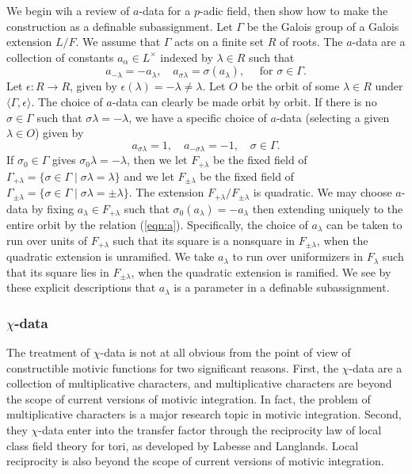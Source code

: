 We begin wih a review of $a$-data for a $p$-adic field, then show how to make the construction as a definable subassignment.
Let $\Gamma$ be the Galois group of a Galois extension $L/F$.  We assume that $\Gamma$ acts on a finite set $R$ of roots.
The $a$-data are a collection of constants $a_\alpha\in L^\times$ indexed by $\lambda\in R$ such that
\begin{equation}\label{eqn:a}
a_{-\lambda} = -a_\lambda,\quad a_{\sigma\lambda} = \sigma(a_\lambda),\quad \text{ for } \sigma\in \Gamma.
\end{equation}
Let $\epsilon:R\to R$, given by $\epsilon(\lambda)=-\lambda\ne\lambda$.  Let $O$ be the orbit of some $\lambda\in R$ under $\langle\Gamma,\epsilon\rangle$.
The choice of $a$-data can clearly be made orbit by orbit.
If there is no $\sigma\in \Gamma$ such that $\sigma\lambda=-\lambda$, we have a specific choice of $a$-data (selecting a given $\lambda\in O$) given by
\[
a_{\sigma\lambda}=1,\quad a_{-\sigma\lambda}=-1,\quad \sigma\in\Gamma.
\]
If $\sigma_0\in\Gamma$ gives $\sigma_0\lambda=-\lambda$,  then we let $F_{+\lambda}$ be the fixed field of $\Gamma_{+\lambda} = \{\sigma\in\Gamma\mid \sigma\lambda=\lambda\}$
and we let
$F_{\pm\lambda}$ be the fixed field of $\Gamma_{\pm\lambda} = \{\sigma\in\Gamma\mid \sigma\lambda=\pm\lambda\}$.
The extension $F_{+\lambda}/F_{\pm\lambda}$ is quadratic.
We may choose $a$-data by fixing $a_\lambda\in F_{+\lambda}$ such that $\sigma_0(a_\lambda) = -a_\lambda$ then extending uniquely to the entire orbit  by the relation (\ref{eqn:a}).
Specifically, the choice of $a_\lambda$ can be taken to run over units of $F_{+\lambda}$ such that its square is a nonsquare in $F_{\pm\lambda}$, when the quadratic extension is unramified.
We take $a_\lambda$ to run over uniformizers in $F_{\lambda}$ such that its square lies in $F_{\pm\lambda}$, when the quadratic extension is ramified.
We see by these explicit descriptions that $a_\lambda$ is a parameter in a definable subassignment.


\subsubsection{$\chi$-data}



The treatment of $\chi$-data is not at all obvious from the point of view of constructible motivic functions for two significant reasons.
First, the $\chi$-data are a collection of multiplicative characters, and multiplicative characters are beyond the scope of current versions of motivic integration.
In fact, the problem of multiplicative characters is a major research topic in motivic integration.
Second, they $\chi$-data enter into the transfer factor through the reciprocity law of local class field theory for tori, as developed by Labesse and Langlands.
Local reciprocity is also beyond the scope of current versions of motivic integration.


